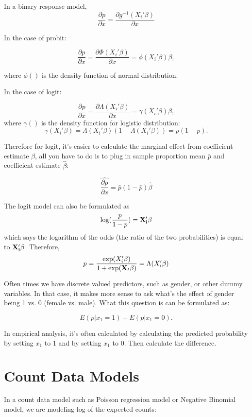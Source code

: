 In a binary response model, 
\[\frac{\partial p}{\partial  x} = \frac{\partial  g^{-1}(X_i' \beta)}{\partial  x}\]

In the case of probit:

\[\frac{\partial p}{\partial x} = \frac{\partial \Phi (X_i'
  \beta)}{\partial x} = \phi(X_i' \beta) \beta, \]

where $\phi()$ is the density function of normal distribution.  

In the case of logit:

\[\frac{\partial p}{\partial  x} = \frac{\partial  \Lambda (X_i' \beta)}{\partial  x} = \gamma(X_i' \beta) \beta, \]
where $\gamma()$ is the density function for logistic distribution:
\[\gamma(X_i' \beta) = \Lambda(X_i' \beta) (1- \Lambda(X_i' \beta)) = p(1-p).\]

Therefore for logit, it's easier to calculate the marginal effect from
coefficient estimate $\beta$, all you have to do is to plug in sample
proportion mean $\bar p$ and coefficient estimate $\hat \beta$:

\[ \hat{ \frac{\partial p}{\partial x}} = \bar p (1- \bar p) \hat \beta \]

The logit model can also be formulated as 
\begin{equation}
\log (\frac{p}{1-p})=\bf X_i' \beta
\end{equation}
which says the logarithm of the odds (the ratio of the two
probabilities) is equal to $\bf X_i' \beta$.  Therefore,
\begin{equation}
p =\frac{\exp( X_i' \beta)}{1+\exp({\bf X}_t
\beta)}=\Lambda( X_i' \beta)
\end{equation}



Often times we have discrete valued predictors, such as gender, or other dummy variables.  In that case, it makes more sense to ask what's the effect of gender being 1 vs. 0 (female vs. male).  What this question is can be formulated as:

\[ E(p | x_1=1) - E(p | x_1=0). \] 

In empirical analysis, it's often calculated by calculating the predicted probability by setting $x_1$ to 1 and by setting $x_1$ to 0.  Then calculate the difference.  


\section{Count Data Models}

In a count data model such as Poisson regression model or Negative Binomial model, we are modeling log of the expected counts:

